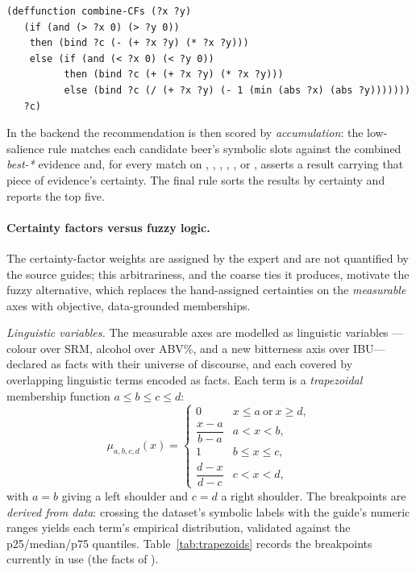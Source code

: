 \begin{lstlisting}
(deffunction combine-CFs (?x ?y)
   (if (and (> ?x 0) (> ?y 0))
    then (bind ?c (- (+ ?x ?y) (* ?x ?y)))
    else (if (and (< ?x 0) (< ?y 0))
          then (bind ?c (+ (+ ?x ?y) (* ?x ?y)))
          else (bind ?c (/ (+ ?x ?y) (- 1 (min (abs ?x) (abs ?y)))))))
   ?c)
\end{lstlisting}

In the \cf{} backend the recommendation is then scored by \emph{accumulation}:
the low-salience  rule matches each candidate beer's
symbolic slots against the combined \emph{best-*} evidence and, for every match
on , , , ,
,  or , asserts
a result  carrying that piece of evidence's
certainty. The final rule sorts the results by certainty and reports the top
five.

\paragraph{Certainty factors versus fuzzy logic.}
\label{sec:cf-vs-fuzzy}
The certainty-factor weights are assigned by the expert and are not quantified by
the source guides; this arbitrariness, and the coarse ties it produces, motivate
the fuzzy alternative, which replaces the hand-assigned certainties on the
\emph{measurable} axes with objective, data-grounded memberships.

\emph{Linguistic variables.} The measurable axes are modelled as linguistic
variables ---colour over SRM, alcohol over ABV\%, and a new bitterness axis over
IBU--- declared as  facts with their universe of discourse, and
each covered by overlapping linguistic terms encoded as  facts.
Each term is a \emph{trapezoidal} membership function $a\le b\le c\le d$:
\begin{equation}
\mu_{a,b,c,d}(x)=
\begin{cases}
0 & x\le a \ \text{or}\ x\ge d,\\[3pt]
\dfrac{x-a}{b-a} & a<x<b,\\[8pt]
1 & b\le x\le c,\\[3pt]
\dfrac{d-x}{d-c} & c<x<d,
\end{cases}
\label{eq:trap}
\end{equation}
with $a{=}b$ giving a left shoulder and $c{=}d$ a right shoulder. The
breakpoints are \emph{derived from data}: crossing the dataset's symbolic labels
with the guide's numeric ranges yields each term's empirical distribution,
validated against the p25/median/p75 quantiles. Table~\ref{tab:trapezoids}
records the breakpoints currently in use (the  facts of
).

